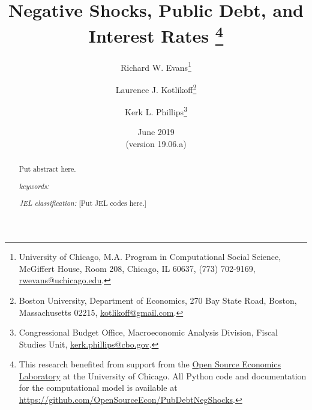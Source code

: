 \documentclass[letterpaper,12pt]{article}
\theoremstyle{definition}
\begin{document}
\begin{titlepage}
\title{Negative Shocks, Public Debt, and Interest Rates \thanks{This research benefited from support from the \href{https://www.oselab.org/}{Open Source Economics Laboratory} at the University of Chicago. All Python code and documentation for the computational model is available at \href{https://github.com/OpenSourceEcon/PubDebtNegShocks}{https://github.com/OpenSourceEcon/PubDebtNegShocks}.}
}
\author{
  Richard W. Evans\footnote{University of Chicago, M.A. Program in Computational Social Science, McGiffert House, Room 208, Chicago, IL 60637, (773) 702-9169, \href{mailto:rwevans@uchicago.edu}{rwevans@uchicago.edu}.}
  \and
  Laurence J. Kotlikoff\footnote{Boston University, Department of Economics, 270 Bay State Road, Boston, Massachusetts 02215, \href{mailto:kotlikoff@gmail.com}{kotlikoff@gmail.com}.}
  \and
  Kerk L. Phillips\footnote{Congressional Budget Office, Macroeconomic Analysis Division, Fiscal Studies Unit, \href{mailto:kerk.phillips@cbo.gov}{kerk.phillips@cbo.gov}.}}
\date{June 2019 \\
  \scriptsize{(version 19.06.a)}}
\maketitle
\vspace{-9mm}
\begin{abstract}
  Put abstract here.
  \vspace{3mm}

  \noindent\textit{keywords:}

  \vspace{3mm}

  \noindent\textit{JEL classification:} [Put JEL codes here.]

\end{abstract}
\thispagestyle{empty}
\end{titlepage}
\end{document}
